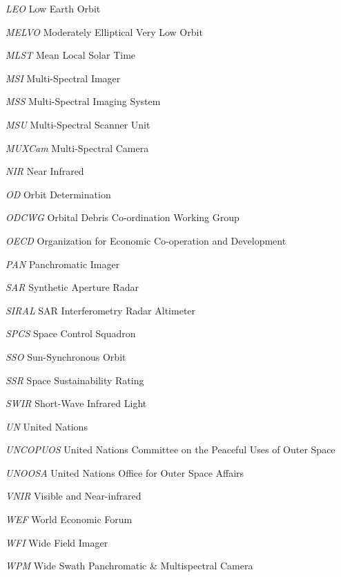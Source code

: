 \documentclass[12pt,a4paper,notitlepage,oneside,openright]{report}
\begin{document}
\begin{abbrv}
\item[\textit{LEO}] Low Earth Orbit
\item[\textit{MELVO}] Moderately Elliptical Very Low Orbit
\item[\textit{MLST}] Mean Local Solar Time
\item[\textit{MSI}] Multi-Spectral Imager
\item[\textit{MSS}] Multi-Spectral Imaging System
\item[\textit{MSU}] Multi-Spectral Scanner Unit
\item[\textit{MUXCam}] Multi-Spectral Camera
\item[\textit{NIR}] Near Infrared
\item[\textit{OD}] Orbit Determination
\item[\textit{ODCWG}] Orbital Debris Co-ordination Working Group
\item[\textit{OECD}] Organization for Economic Co-operation and Development
\item[\textit{PAN}] Panchromatic Imager
\item[\textit{SAR}] Synthetic Aperture Radar
\item[\textit{SIRAL}] SAR Interferometry Radar Altimeter
\item[\textit{SPCS}] Space Control Squadron
\item[\textit{SSO}] Sun-Synchronous Orbit
\item[\textit{SSR}] Space Sustainability Rating
\item[\textit{SWIR}] Short-Wave Infrared Light
\item[\textit{UN}] United Nations
\item[\textit{UNCOPUOS}] United Nations Committee on the Peaceful Uses of Outer Space
\item[\textit{UNOOSA}] United Nations Office for Outer Space Affairs
\item[\textit{VNIR}] Visible and Near-infrared
\item[\textit{WEF}] World Economic Forum
\item[\textit{WFI}] Wide Field Imager
\item[\textit{WPM}] Wide Swath Panchromatic \& Multispectral Camera
\end{abbrv}
\end{document}
